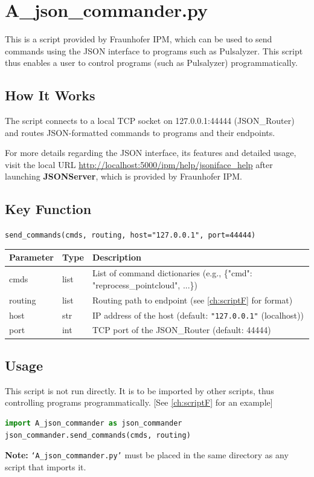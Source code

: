 \chapter{A\_json\_commander.py}

This is a script provided by Fraunhofer IPM, which can be used to send commands using the JSON interface to programs such as Pulsalyzer. This script thus enables a user to control programs (such as Pulsalyzer) programmatically.

\section{How It Works}
The script connects to a local TCP socket on 127.0.0.1:44444 (JSON\_Router) and routes JSON-formatted commands to programs and their endpoints.

For more details regarding the JSON interface, its features and detailed usage, visit the local URL \url{http://localhost:5000/ipm/help/jsoniface_help} after launching \textbf{JSONServer}, which is provided by Fraunhofer IPM.

\section{Key Function}
\texttt{send\_commands(cmds, routing, host="127.0.0.1", port=44444)}

\begin{table}[ht!]
    \centering
    \begin{tabular}{lll}
        \toprule
        Parameter & Type & Description                                                                  \\
        \midrule
        cmds      & list & List of command dictionaries (e.g., \{"cmd": "reprocess\_pointcloud", ...\}) \\
        routing   & list & Routing path to endpoint (see \autoref{ch:scriptF} for format)               \\
        host      & str  & IP address of the host (default: \texttt{"127.0.0.1"} (localhost))           \\
        port      & int  & TCP port of the JSON\_Router (default: 44444)                                \\
        \bottomrule
    \end{tabular}
\end{table}

\section{Usage}
This script is not run directly. It is to be imported by other scripts, thus controlling programs programmatically. [See \autoref{ch:scriptF} for an example]

\begin{lstlisting}[language=python, numbers=none]
import A_json_commander as json_commander
json_commander.send_commands(cmds, routing)
\end{lstlisting}

\textbf{Note:} \texttt{`A\_json\_commander.py'} must be placed in the same directory as any script that imports it.
